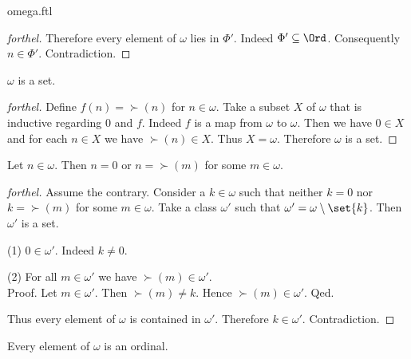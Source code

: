 \documentclass{naproche-library}
\begin{document}
\begin{smodule}{omega.ftl}
\begin{proof}[forthel]
    Therefore every element of $\omega$ lies in $\Phi'$.
    Indeed $\Phi' \subseteq \Ord$.
    Consequently $n \in \Phi'$.
    Contradiction.
  \end{proof}

  \begin{corollary}[forthel,id=SET_THEORY_03_4847727433220096]
    $\omega$ is a set.
  \end{corollary}
  \begin{proof}[forthel]
    Define $f(n) = \succ(n)$ for $n \in \omega$.
    Take a subset $X$ of $\omega$ that is inductive regarding $0$ and $f$.
    Indeed $f$ is a map from $\omega$ to $\omega$.
    Then we have $0 \in X$ and for each $n \in X$ we have $\succ(n) \in X$.
    Thus $X = \omega$.
    Therefore $\omega$ is a set.
  \end{proof}

  \begin{proposition}[forthel,id=SET_THEORY_03_5885789275684864]
    Let $n \in \omega$.
    Then $n = 0$ or $n = \succ(m)$ for some $m \in \omega$.
  \end{proposition}
  \begin{proof}[forthel]
    Assume the contrary.
    Consider a $k \in \omega$ such that neither $k = 0$ nor $k = \succ(m)$ for
    some $m \in \omega$.
    Take a class $\omega'$ such that $\omega' = \omega \setminus \set{k}$. %
    Then $\omega'$ is a set.

    (1) $0 \in \omega'$.
    Indeed $k \neq 0$.

    (2) For all $m \in \omega'$ we have $\succ(m) \in \omega'$. \\
    Proof.
      Let $m \in \omega'$.
      Then $\succ(m) \neq k$.
      Hence $\succ(m) \in \omega'$.
    Qed.

    Thus every element of $\omega$ is contained in $\omega'$.
    Therefore $k \in \omega'$.
    Contradiction.
  \end{proof}

  \begin{proposition}[forthel,id=SET_THEORY_03_5057540872208384]
    Every element of $\omega$ is an ordinal.
  \end{proposition}
\end{smodule}
\end{document}
